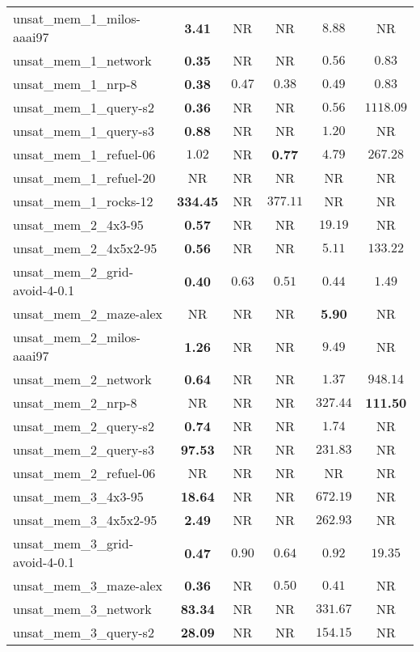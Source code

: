 \begin{tabular}{lccccc}
unsat\_mem\_1\_milos-aaai97 & \textbf{3.41} & NR & NR & $8.88$ & NR \\
unsat\_mem\_1\_network & \textbf{0.35} & NR & NR & $0.56$ & $0.83$ \\
unsat\_mem\_1\_nrp-8 & \textbf{0.38} & $0.47$ & $0.38$ & $0.49$ & $0.83$ \\
unsat\_mem\_1\_query-s2 & \textbf{0.36} & NR & NR & $0.56$ & $1118.09$ \\
unsat\_mem\_1\_query-s3 & \textbf{0.88} & NR & NR & $1.20$ & NR \\
unsat\_mem\_1\_refuel-06 & $1.02$ & NR & \textbf{0.77} & $4.79$ & $267.28$ \\
unsat\_mem\_1\_refuel-20 & NR & NR & NR & NR & NR \\
unsat\_mem\_1\_rocks-12 & \textbf{334.45} & NR & $377.11$ & NR & NR \\
unsat\_mem\_2\_4x3-95 & \textbf{0.57} & NR & NR & $19.19$ & NR \\
unsat\_mem\_2\_4x5x2-95 & \textbf{0.56} & NR & NR & $5.11$ & $133.22$ \\
unsat\_mem\_2\_grid-avoid-4-0.1 & \textbf{0.40} & $0.63$ & $0.51$ & $0.44$ & $1.49$ \\
unsat\_mem\_2\_maze-alex & NR & NR & NR & \textbf{5.90} & NR \\
unsat\_mem\_2\_milos-aaai97 & \textbf{1.26} & NR & NR & $9.49$ & NR \\
unsat\_mem\_2\_network & \textbf{0.64} & NR & NR & $1.37$ & $948.14$ \\
unsat\_mem\_2\_nrp-8 & NR & NR & NR & $327.44$ & \textbf{111.50} \\
unsat\_mem\_2\_query-s2 & \textbf{0.74} & NR & NR & $1.74$ & NR \\
unsat\_mem\_2\_query-s3 & \textbf{97.53} & NR & NR & $231.83$ & NR \\
unsat\_mem\_2\_refuel-06 & NR & NR & NR & NR & NR \\
unsat\_mem\_3\_4x3-95 & \textbf{18.64} & NR & NR & $672.19$ & NR \\
unsat\_mem\_3\_4x5x2-95 & \textbf{2.49} & NR & NR & $262.93$ & NR \\
unsat\_mem\_3\_grid-avoid-4-0.1 & \textbf{0.47} & $0.90$ & $0.64$ & $0.92$ & $19.35$ \\
unsat\_mem\_3\_maze-alex & \textbf{0.36} & NR & $0.50$ & $0.41$ & NR \\
unsat\_mem\_3\_network & \textbf{83.34} & NR & NR & $331.67$ & NR \\
unsat\_mem\_3\_query-s2 & \textbf{28.09} & NR & NR & $154.15$ & NR \\

\end{tabular}
